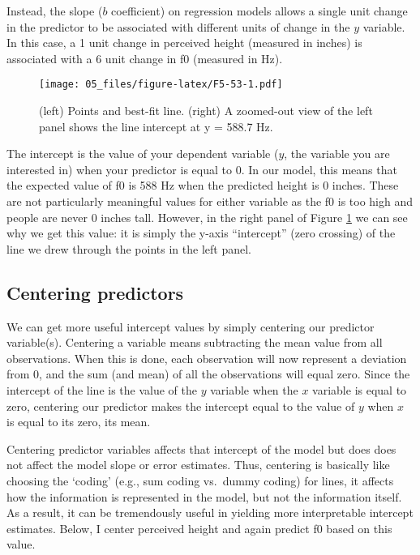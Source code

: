 \documentclass[
]{book}
\begin{document}
Instead, the slope (\(b\) coefficient) on regression models allows a single unit change in the predictor to be associated with different units of change in the \(y\) variable. In this case, a 1 unit change in perceived height (measured in inches) is associated with a 6 unit change in f0 (measured in Hz).

\begin{figure}
\centering
\texttt{[image: 05\_files/figure-latex/F5-53-1.pdf]}
\caption{\label{fig:F5-53}(left) Points and best-fit line. (right) A zoomed-out view of the left panel shows the line intercept at y = 588.7 Hz.}
\end{figure}

The intercept is the value of your dependent variable (\(y\), the variable you are interested in) when your predictor is equal to 0. In our model, this means that the expected value of f0 is 588 Hz when the predicted height is 0 inches. These are not particularly meaningful values for either variable as the f0 is too high and people are never 0 inches tall. However, in the right panel of Figure \ref{fig:F5-53} we can see why we get this value: it is simply the y-axis ``intercept'' (zero crossing) of the line we drew through the points in the left panel.

\hypertarget{centering-predictors}{%
\subsection{Centering predictors}\label{centering-predictors}}

We can get more useful intercept values by simply centering our predictor variable(s). Centering a variable means subtracting the mean value from all observations. When this is done, each observation will now represent a deviation from 0, and the sum (and mean) of all the observations will equal zero. Since the intercept of the line is the value of the \(y\) variable when the \(x\) variable is equal to zero, centering our predictor makes the intercept equal to the value of \(y\) when \(x\) is equal to its zero, its mean.

Centering predictor variables affects that intercept of the model but does does not affect the model slope or error estimates. Thus, centering is basically like choosing the `coding' (e.g., sum coding vs.~dummy coding) for lines, it affects how the information is represented in the model, but not the information itself. As a result, it can be tremendously useful in yielding more interpretable intercept estimates. Below, I center perceived height and again predict f0 based on this value.
\end{document}
